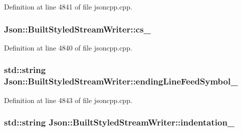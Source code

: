 Definition at line 4841 of file jsoncpp.\+cpp.

\subsubsection[{\texorpdfstring{cs\+\_\+}{cs_}}]{ Json\+::\+Built\+Styled\+Stream\+Writer\+::cs\+\_\+\hspace{0.3cm}{\ttfamily [private]}}\hypertarget{struct_json_1_1_built_styled_stream_writer_a89a9c76c7531143b52785861ba21c1d4}{}\label{struct_json_1_1_built_styled_stream_writer_a89a9c76c7531143b52785861ba21c1d4}


Definition at line 4840 of file jsoncpp.\+cpp.

\subsubsection[{\texorpdfstring{ending\+Line\+Feed\+Symbol\+\_\+}{endingLineFeedSymbol_}}]{\setlength{\rightskip}{0pt plus 5cm}std\+::string Json\+::\+Built\+Styled\+Stream\+Writer\+::ending\+Line\+Feed\+Symbol\+\_\+\hspace{0.3cm}{\ttfamily [private]}}\hypertarget{struct_json_1_1_built_styled_stream_writer_a85a8c0e3c9deb2503d497f61bc0da74c}{}\label{struct_json_1_1_built_styled_stream_writer_a85a8c0e3c9deb2503d497f61bc0da74c}


Definition at line 4843 of file jsoncpp.\+cpp.

\subsubsection[{\texorpdfstring{indentation\+\_\+}{indentation_}}]{\setlength{\rightskip}{0pt plus 5cm}std\+::string Json\+::\+Built\+Styled\+Stream\+Writer\+::indentation\+\_\+\hspace{0.3cm}{\ttfamily [private]}}\hypertarget{struct_json_1_1_built_styled_stream_writer_ab1d7561ca0f480cb46cc113e1005e8ac}{}\label{struct_json_1_1_built_styled_stream_writer_ab1d7561ca0f480cb46cc113e1005e8ac}


